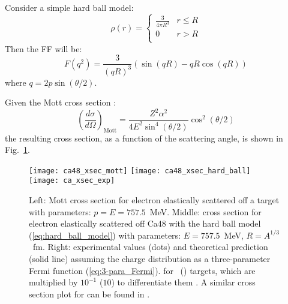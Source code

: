 Consider a simple hard ball model:
\begin{equation}
    \rho(r) = 
    \begin{cases}
	\frac{3}{4\pi R^3}  & r \le R	\\
	0		    & r > R   \\
    \end{cases}
    \label{eq:hard_ball_model}
\end{equation}
Then the FF will be:
\begin{equation}
    F(q^2) = \frac{3}{(qR)^3} \left( \sin(qR) - qR\cos(qR) \right)
\end{equation}
where $q = 2p\sin(\theta/2)$.

Given the Mott cross section \cite{punjabi2015structure}: 
\begin{equation}
    \left( \frac{d\sigma}{d\Omega} \right)_{\text{Mott}} = 
	\frac{Z^2 \alpha^2}{4E^2\sin^4(\theta/2)}\cos^2(\theta/2)   
\end{equation}
the resulting cross section, as a function of the scattering angle, is shown in Fig.~\ref{fig:ca_xsec}.
\begin{figure}
    \texttt{[image: ca48\_xsec\_mott]}
    \texttt{[image: ca48\_xsec\_hard\_ball]}
    \texttt{[image: ca\_xsec\_exp]}
    \caption[Cross section of \Ca]{Left: Mott cross section for electron elastically scattered off a \Ca
    target with parameters: $p=E=757.5$~MeV.
    Middle: cross section for electron elastically scattered off Ca48 with the hard ball
    model (\ref{eq:hard_ball_model}) with parameters: $E =  757.5$~MeV, $R=A^{1/3}$~fm. 
    Right: experimental values (dots) and theoretical prediction (solid line)
    assuming the charge distribution as a three-parameter Fermi function (\ref{eq:3-para_Fermi}).
    for \Ca \ (\ca) targets, which are multiplied by $10^{-1}$ ($10$) to differentiate them
    \cite{PhysRevLett.19.527}. A similar cross section plot for \Pb can be found
    in \cite{PhysRevLett.38.152}.
    }
    \label{fig:ca_xsec}
\end{figure}

